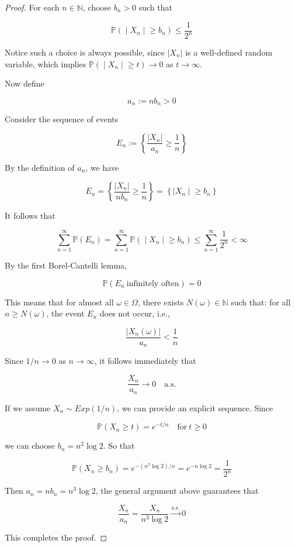 \documentclass{qlnotes-export}
\begin{document}
\begin{proof}

For each \(n \in {\mathbb{N}}\), choose \(b_{n} > 0\) such that

\[\left. {\mathbb{P}}( \middle| X_{n} \middle| \geq b_{n}) \leq \frac{1}{2^{n}} \right.\]

Notice such a choice is always possible, since \(|X_{n}|\) is a well-defined random variable, which implies \(\left. {\mathbb{P}}( \middle| X_{n} \middle| \geq t)\rightarrow 0 \right.\) as \(t\rightarrow\infty\).

Now define

\[a_{n} := nb_{n} > 0\]

Consider the sequence of events

\[E_{n} := \left\{ {\frac{|X_{n}|}{a_{n}} \geq \frac{1}{n}} \right\}\]

By the definition of \(a_{n}\), we have

\[E_{n} = \left\{ {\frac{|X_{n}|}{nb_{n}} \geq \frac{1}{n}} \right\} = \left\{ |X_{n} \middle| \geq b_{n} \right\}\]

It follows that

\[\left. \sum\limits_{n = 1}^{\infty}{\mathbb{P}}(E_{n}) = \sum\limits_{n = 1}^{\infty}{\mathbb{P}}( \middle| X_{n} \middle| \geq b_{n}) \leq \sum\limits_{n = 1}^{\infty}\frac{1}{2^{n}} < \infty \right.\]

By the first Borel-Cantelli lemma,

\[{\mathbb{P}}(E_{n}\ \text{infinitely often}) = 0\]

This means that for almost all \(\omega \in \Omega\), there exists \(N(\omega) \in {\mathbb{N}}\) such that: for all \(n \geq N(\omega)\), the event \(E_{n}\) does not occur, i.e.,

\[\frac{|X_{n}(\omega)|}{a_{n}} < \frac{1}{n}\]

Since \(1/n\rightarrow 0\) as \(n\rightarrow\infty\), it follows immediately that

\[\frac{X_{n}}{a_{n}}\rightarrow 0\quad\text{a.s.}\]

If we assume \(X_{n} \sim Exp(1/n)\), we can provide an explicit sequence. Since

\[{\mathbb{P}}(X_{n} \geq t) = e^{- t/n}\quad\text{for}\ t \geq 0\]

we can choose \(b_{n} = n^{2}\log 2\). So that

\[{\mathbb{P}}(X_{n} \geq b_{n}) = e^{- (n^{2}\log 2)/n} = e^{- n\log 2} = \frac{1}{2^{n}}\]

Then \(a_{n} = nb_{n} = n^{3}\log 2\), the general argument above guarantees that

\[\frac{X_{n}}{a_{n}} = \frac{X_{n}}{n^{3}\log 2}\overset{\text{a.s.}}{\rightarrow}0\]

This completes the proof.

\end{proof}
\end{document}
